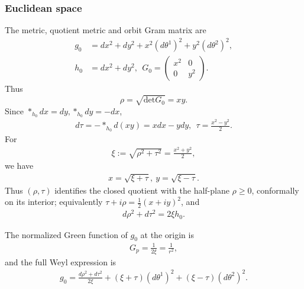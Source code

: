 \documentclass[letterpaper]{amsart}
\theoremstyle{definition}
\theoremstyle{remark}
\begin{document}
\subsubsection{Euclidean space}
The metric, quotient metric and orbit Gram matrix are
\begin{align*}
	g_0 &= d x ^2 + d y ^2 + x ^2 (d \theta ^1) ^2 + y ^2  (d \theta ^2) ^2,\\
	h_0 &= d x ^2 + d y ^2,\ \ G_0 = \begin{pmatrix} x ^2 & 0 \\ 0 & y ^2 \end{pmatrix}. 
\end{align*} 
Thus $$\rho = \sqrt{\mathrm{det} G_0} = x y .$$
Since $* _{h_{0}} d x = d y, *_{h_0} d y = - d x$,
 \begin{align*}
	d \tau = - *_{h_0} d (x y) = x d x - y d y,\ \ \tau = \frac{x ^2 - y ^2}{2}.
\end{align*} 
For
\begin{align*}
	\xi := \sqrt{\rho ^2 + \tau ^2} = \frac{x ^2+ y ^2}{2},
\end{align*} 
we have
\begin{align*}
	x = \sqrt{\xi + \tau } ,\ y= \sqrt{\xi - \tau } .
\end{align*} 
Thus $(\rho,\tau)$ identifies the closed quotient with the half-plane $\rho\ge0$, conformally on its interior; equivalently $\tau + i \rho = \frac{1}{2}(x+ i y)^2$, and
\begin{align*}
	d \rho ^2 + d \tau ^2 = 2 \xi h_0.
\end{align*} 

The normalized Green function of $g_0$ at the origin  is
\begin{align*}
	G_p = \frac{1}{2 \xi } = \frac{1}{r^2},
\end{align*} 
and the full Weyl expression is
\begin{align*}
	g_0 = \frac{d \rho ^2+ d \tau ^2}{2\xi } + (\xi +\tau ) (d \theta ^{1})^2 + (\xi - \tau ) (d \theta ^2)^2.
\end{align*} 
\end{document}
